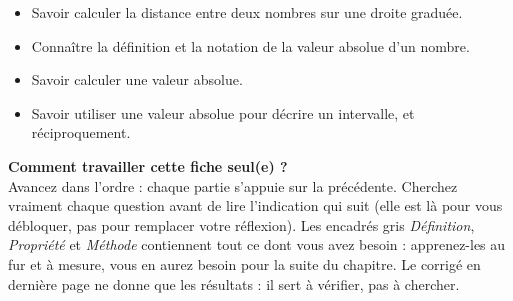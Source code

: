 \documentclass[10pt,a4paper]{article}
\begin{document}

\vspace{-0.3cm}

\begin{objectifs}
\begin{itemize}
    \item Savoir calculer la distance entre deux nombres sur une droite graduée.
    \item Connaître la définition et la notation de la valeur absolue d'un nombre.
    \item Savoir calculer une valeur absolue.
    \item Savoir utiliser une valeur absolue pour décrire un intervalle, et réciproquement.
\end{itemize}
\end{objectifs}

\begin{cbox}
\textbf{Comment travailler cette fiche seul(e) ?}\\
Avancez dans l'ordre : chaque partie s'appuie sur la précédente. Cherchez vraiment chaque question avant de lire l'indication qui suit (elle est là pour vous débloquer, pas pour remplacer votre réflexion). Les encadrés gris \textit{Définition}, \textit{Propriété} et \textit{Méthode} contiennent tout ce dont vous avez besoin : apprenez-les au fur et à mesure, vous en aurez besoin pour la suite du chapitre. Le corrigé en dernière page ne donne que les résultats : il sert à vérifier, pas à chercher.
\end{cbox}
\end{document}
